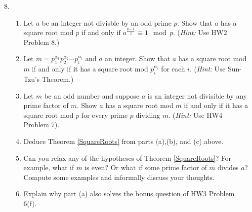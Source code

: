 \documentclass[11pt]{article}
\begin{document}
  \begin{enumerate}
  \setcounter{enumi}{7}
  \item{
  \begin{enumerate}
    \item{
    Let $a$ be an integer not divisble by an odd prime $p$.  Show that $a$ has a square root mod $p$ if and only if $a^{\frac{p-1}{2}}\equiv 1\mod p$. (\textit{Hint:} Use HW2 Problem 8.)
    }
    \item{
    Let $m = p_1^{\alpha_1}p_2^{\alpha_2}\cdots p_t^{\alpha_t}$ and $a$ an integer.  Show that $a$ has a square root mod $m$ if and only if it has a square root mod $p_i^{\alpha_i}$ for each $i$. (\textit{Hint:} Use Sun-Tzu's Theorem.)
    }
    \item{
    Let $m$ be an odd number and suppose $a$ is an integer not divisible by any prime factor of $m$.  Show $a$ has a square root mod $m$ if and only if it has a square root mod $p$ for every prime $p$ dividing $m$. (\textit{Hint:} Use HW4 Problem 7).
    }
    \item{
    Deduce Theorem \ref{SquareRoots} from parts (a),(b), and (c) above.
    }
    \item{
    Can you relax any of the hypotheses of Theorem \ref{SquareRoots}?  For example, what if $m$ is even?  Or what if some prime factor of $m$ divides $a$?  Compute some examples and informally discuss your thoughts.
    }
    \item{
      Explain why part (a) also solves the bonus question of HW3 Problem 6(f).
    }
  \end{enumerate}
  }
  \end{enumerate}
\end{document}
